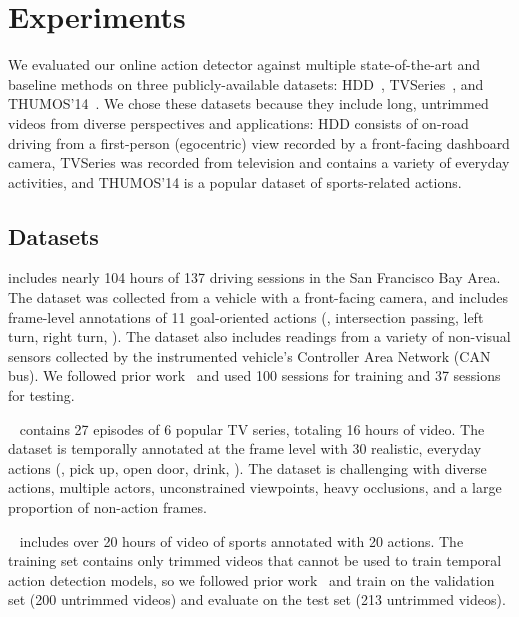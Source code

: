 \section{Experiments}

We evaluated our online action detector against multiple
state-of-the-art and baseline methods on three publicly-available
datasets: HDD~\cite{RamanishkaCVPR2018}, TVSeries~\cite{de2016online},
and THUMOS'14~\cite{THUMOS14}. 
We chose these datasets because they
include long, untrimmed videos from diverse
perspectives and applications:
HDD consists of on-road driving from a first-person
(egocentric) view recorded by a front-facing dashboard camera, TVSeries
was recorded from television and contains a variety of
everyday activities, and THUMOS'14 is a popular dataset of
sports-related actions.

\subsection{Datasets}

\vspace{-5pt} \cite{RamanishkaCVPR2018} includes nearly 104
hours of 137 driving sessions in the San Francisco Bay Area. The
dataset was collected from a vehicle with a front-facing
camera, and includes frame-level annotations of 11 goal-oriented
actions (\eg, intersection passing, left turn,
right turn, \etc). The dataset also includes readings from a
variety of non-visual sensors collected by the instrumented vehicle's
Controller Area Network (CAN bus). We followed prior
work~\cite{RamanishkaCVPR2018} and used 100 sessions for training and
37 sessions for testing.

~\cite{de2016online} contains 27 episodes of 6 popular
TV series, totaling 16 hours of video. The dataset is temporally
annotated at the frame level with 30 realistic, everyday actions (\eg,
pick up, open door, drink, \etc). The dataset is challenging with
diverse actions, multiple actors,
unconstrained viewpoints, heavy occlusions, and a large proportion of
non-action frames.

~\cite{THUMOS14} includes over 20 hours of video
of sports annotated with 20 actions. The training set contains only trimmed videos
that cannot be used to train temporal action detection models, so
we followed prior work~\cite{gao2017red}
and train on the validation set (200 untrimmed videos) and evaluate on the test set (213 untrimmed videos).

